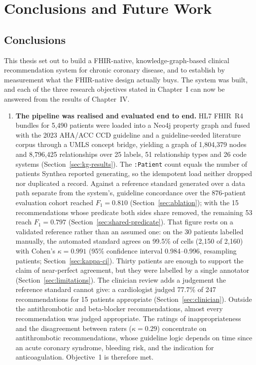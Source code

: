 \chapter{Conclusions and Future Work}

\section{Conclusions}

This thesis set out to build a FHIR-native, knowledge-graph-based clinical recommendation
system for chronic coronary disease, and to establish by measurement what the FHIR-native
design actually buys. The system was built, and each of the three research objectives stated
in Chapter~I can now be answered from the results of Chapter~IV.

\begin{enumerate}
    \item \textbf{The pipeline was realised and evaluated end to end.} HL7 FHIR~R4 bundles
    for 5{,}490 patients were loaded into a Neo4j property graph and fused with the 2023
    AHA/ACC CCD guideline and a guideline-seeded literature corpus through a UMLS concept
    bridge, yielding a graph of 1{,}804{,}379 nodes and 8{,}796{,}425 relationships over 25
    labels, 51 relationship types and 26 code systems
    (Section~\ref{sec:kg-results}). The \texttt{:Patient} count equals the number of patients
    Synthea reported generating, so the idempotent load neither dropped nor duplicated a
    record. Against a reference standard generated over a data path separate from the system's,
    guideline concordance over the 876-patient evaluation cohort reached
    $F_1 = 0.810$ (Section~\ref{sec:ablation}); with the 15 recommendations whose predicate
    both sides share removed, the remaining 53 reach $F_1 = 0.797$
    (Section~\ref{sec:shared-predicate}). That figure rests on a
    validated reference rather than an assumed one: on the 30 patients labelled
    manually, the automated standard agrees on 99.5\% of cells
    (2{,}150 of 2{,}160) with Cohen's $\kappa = 0.991$ (95\% confidence interval
    0.984--0.996, resampling patients; Section~\ref{sec:kappa-ci}). Thirty patients are enough
    to support the claim of near-perfect agreement, but they were labelled by a single annotator
    (Section~\ref{sec:limitations}). The clinician review adds a judgement the reference
    standard cannot give: a cardiologist judged 77.7\% of 247 recommendations for 15 patients
    appropriate (Section~\ref{sec:clinician}). Outside the antithrombotic and beta-blocker
    recommendations, almost every recommendation was judged appropriate. The ratings of
    inappropriateness and the disagreement between raters ($\kappa = 0.29$) concentrate on
    antithrombotic recommendations, whose guideline logic depends on time since an acute
    coronary syndrome, bleeding risk, and the indication for anticoagulation. Objective~1 is
    therefore met.


\end{enumerate}
